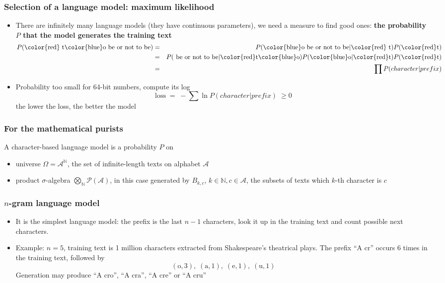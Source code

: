 \documentclass{beamer}
\begin{document}
\begin{frame}
\frametitle{Selection of a language model: maximum likelihood}

\begin{itemize}
\item There are infinitely many language models (they have continuous parameters), we need a measure to find good ones: \textbf{the probability $P$ that the model generates the training text}
\begin{eqnarray*} P(\text{\color{red} t}\text{\color{blue}o}\text{ be or not to be}) &= & P(\text{\color{blue}o}\text{ be or not to be} | \text{\color{red} t} ) P(\text{\color{red}t})\\ &=& P(\text{ be or not to be} | \text{\color{red}t}\text{\color{blue}o} )P(\text{\color{blue}o}|\text{\color{red}t})P(\text{\color{red}t}) \\ &=& \prod P(character | prefix) \end{eqnarray*}
\item Probability too small for 64-bit numbers, compute its log
$$ \text{loss} \; =\; -\sum \ln  P(character | prefix) \; \geq 0 $$
the lower the loss, the better the model
\end{itemize}
\end{frame}

\begin{frame}
\frametitle{For the mathematical purists}
A character-based language model is a probability $P$ on
\bigskip
\begin{itemize}
\item universe $\Omega = \mathcal{A}^\mathbb{N}$, the set of infinite-length texts on alphabet $\mathcal{A}$
\item product $\sigma$-algebra $\bigotimes_\mathbb{N}\mathcal{P}(\mathcal{A})$, in this case generated by $B_{k,c}$, $k\in\mathbb{N}, c\in \mathcal{A}$, the subsets of texts which $k$-th character is $c$
\end{itemize}
\end{frame}

\begin{frame}
\frametitle{$n$-gram language model}

\begin{itemize}
\item It is the simplest language model: the prefix is the last $n-1$ characters, look it up in the training text and count possible next characters.
\bigskip
\item Example: $n=5$, training text is 1 million characters extracted from Shakespeare's theatrical plays. The prefix ``A cr'' occurs 6 times in the training text, followed by
$$ (\text{o}, 3), \; (\text{a}, 1), \; (\text{e},1), \; (\text{u}, 1) $$
Generation may produce ``A cro'', ``A cra'', ``A cre'' or ``A cru''
\end{itemize}
\end{frame}
\end{document}
